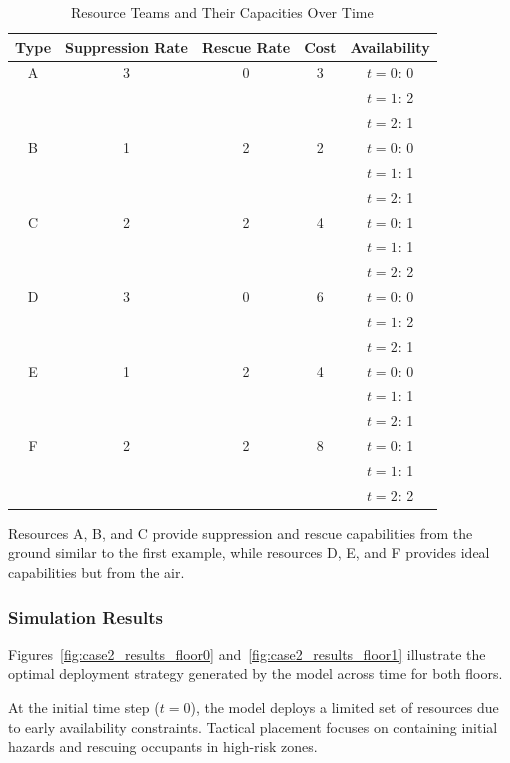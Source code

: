 \begin{table}[!htb]
\centering
\footnotesize
\setlength{\tabcolsep}{4pt}
\caption{Resource Teams and Their Capacities Over Time}
\label{tab:resources_case2}
\begin{tabular}{@{} c c c c c @{}}
\toprule
\textbf{Type} & \textbf{Suppression Rate} & \textbf{Rescue Rate} & \textbf{Cost} & \textbf{Availability} \\
\midrule
A & 3 & 0  & 3  & $t=0$: 0 \\
  &   &    &    & $t=1$: 2 \\
  &   &    &    & $t=2$: 1 \\
\midrule
B & 1 & 2  & 2 & $t=0$: 0 \\
  &   &    &    & $t=1$: 1 \\
  &   &    &    & $t=2$: 1 \\
\midrule
C & 2 & 2  & 4 & $t=0$: 1 \\
  &   &    &    & $t=1$: 1 \\
  &   &    &    & $t=2$: 2 \\
\midrule
D & 3 & 0  & 6  & $t=0$: 0 \\
  &   &    &    & $t=1$: 2 \\
  &   &    &    & $t=2$: 1 \\
\midrule
E & 1 & 2  & 4 & $t=0$: 0 \\
  &   &    &    & $t=1$: 1 \\
  &   &    &    & $t=2$: 1 \\
\midrule
F & 2 & 2  & 8 & $t=0$: 1 \\
  &   &    &    & $t=1$: 1 \\
  &   &    &    & $t=2$: 2 \\
\bottomrule
\end{tabular}
\end{table}

Resources A, B, and C provide suppression and rescue capabilities from the ground similar to the first example, while resources D, E, and F provides ideal capabilities but from the air.

\subsubsection{Simulation Results}

Figures~\ref{fig:case2_results_floor0} and~\ref{fig:case2_results_floor1} illustrate the optimal deployment strategy generated by the model across time for both floors.

At the initial time step ($t=0$), the model deploys a limited set of resources due to early availability constraints. Tactical placement focuses on containing initial hazards and rescuing occupants in high-risk zones.

